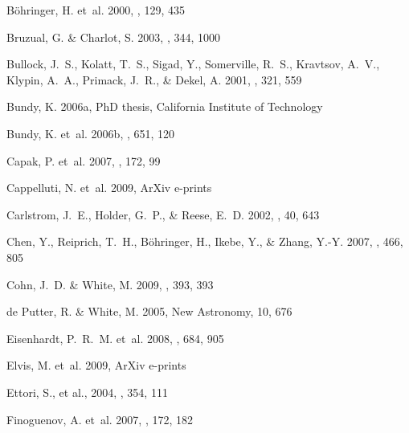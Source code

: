 \documentclass[12pt]{emulateapj}
\begin{document}
\begin{thebibliography}{111}
{B{\"o}hringer}, H. {et~al.} 2000, \apjs, 129, 435

{Bruzual}, G. \& {Charlot}, S. 2003, \mnras, 344, 1000

{Bullock}, J.~S., {Kolatt}, T.~S., {Sigad}, Y., {Somerville}, R.~S.,
  {Kravtsov}, A.~V., {Klypin}, A.~A., {Primack}, J.~R., \& {Dekel}, A. 2001,
  \mnras, 321, 559

{Bundy}, K. 2006a, PhD thesis, California Institute of Technology

{Bundy}, K. {et~al.} 2006b, \apj, 651, 120

{Capak}, P. {et~al.} 2007, \apjs, 172, 99

{Cappelluti}, N. {et~al.} 2009, ArXiv e-prints

{Carlstrom}, J.~E., {Holder}, G.~P., \& {Reese}, E.~D. 2002, \araa, 40, 643

{Chen}, Y., {Reiprich}, T.~H., {B{\"o}hringer}, H., {Ikebe}, Y., \& {Zhang},
  Y.-Y. 2007, \aap, 466, 805

{Cohn}, J.~D. \& {White}, M. 2009, \mnras, 393, 393

{de Putter}, R. \& {White}, M. 2005, New Astronomy, 10, 676

{Eisenhardt}, P.~R.~M. {et~al.} 2008, \apj, 684, 905

{Elvis}, M. {et~al.} 2009, ArXiv e-prints

{Ettori}, S., et al., 2004, \mnras, 354, 111

{Finoguenov}, A. {et~al.} 2007, \apjs, 172, 182


\end{thebibliography}
\end{document}
